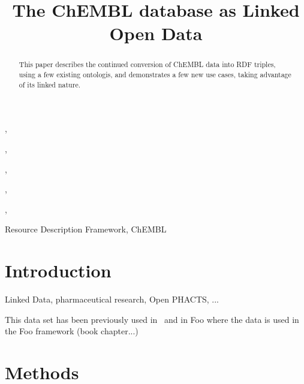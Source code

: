 \documentclass[sw]{iosart2c}
\begin{document}
\begin{frontmatter}

\title{The ChEMBL database as Linked Open Data}



\author[A]{ } %
\address[A]{Maastricht University}

\author[B]{ },
\address[B]{Uppsala University}

\author[C]{ },
\address[C]{xxx}

\author[D]{ },
\address[D]{xxx}

\author[E]{ },
\author[E]{ },
\address[E]{European Bioinformatics Institute}


\begin{abstract}
This paper describes the continued conversion of ChEMBL data into RDF triples, using a few existing
ontologis, and demonstrates a few new use cases, taking advantage of its linked nature.
\end{abstract}

\begin{keyword}
Resource Description Framework, ChEMBL
\end{keyword}

\end{frontmatter}


\section{Introduction}\label{s1}

Linked Data, pharmaceutical research, Open PHACTS, ...

This data set has been previously used in~\cite{Willighagen2011} and in Foo where the data is used
in the Foo framework (book chapter...)


\section{Methods}\label{s2}
\end{document}

